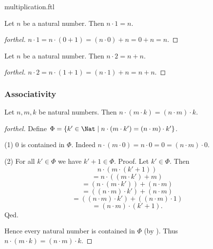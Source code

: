 \documentclass{naproche-library}
\begin{document}
\begin{smodule}{multiplication.ftl}
  \begin{proposition}[forthel,id=ARITHMETIC_06_2910559821365248]
    Let $n$ be a natural number.
    Then $n \cdot 1 = n$.
  \end{proposition}
  \begin{proof}[forthel]
    $n \cdot 1
      = n \cdot (0 + 1)
      = (n \cdot 0) + n
      = 0 + n
      = n$.
  \end{proof}

  \begin{corollary}[forthel,id=ARITHMETIC_06_5679541582299136]
    Let $n$ be a natural number.
    Then $n \cdot 2 = n + n$.
  \end{corollary}
  \begin{proof}[forthel]
    $n \cdot 2
      = n \cdot (1 + 1)
      = (n \cdot 1) + n
      = n + n$.
  \end{proof}


  \subsubsection*{Associativity}

  \begin{proposition}[forthel,id=ARITHMETIC_06_347295585402880]
    Let $n, m, k$ be natural numbers.
    Then $n \cdot (m \cdot k) = (n \cdot m) \cdot k$.
  \end{proposition}
  \begin{proof}[forthel]
    Define $\Phi = \{ k' \in \Nat \mid n \cdot (m \cdot k') = (n \cdot m) \cdot k' \}$.

    (1) $0$ is contained in $\Phi$.
    Indeed $n \cdot (m \cdot 0)
      = n \cdot 0
      = 0
      = (n \cdot m) \cdot 0$.

    (2) For all $k' \in \Phi$ we have $k' + 1 \in \Phi$. \newline
    Proof.
      Let $k' \in \Phi$.
      Then
      \[  n \cdot (m \cdot (k' + 1))                          \]
      \[    = n \cdot ((m \cdot k') + m)                      \]
      \[    = (n \cdot (m \cdot k')) + (n \cdot m)            \]
      \[    = ((n \cdot m) \cdot k') + (n \cdot m)            \]
      \[    = ((n \cdot m) \cdot k') + ((n \cdot m) \cdot 1)  \]
      \[    = (n \cdot m) \cdot (k' + 1).                     \]
    Qed.

    Hence every natural number is contained in $\Phi$ (by ).
    Thus $n \cdot (m \cdot k) = (n \cdot m) \cdot k$.
  \end{proof}



\end{smodule}
\end{document}
